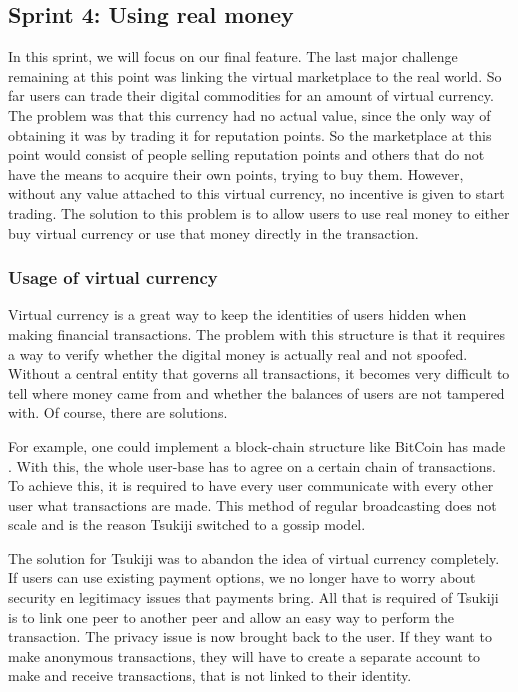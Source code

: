 \subsection{Sprint 4: Using real money}
In this sprint, we will focus on our final feature.
The last major challenge remaining at this point was linking the virtual marketplace to the real world.
So far users can trade their digital commodities for an amount of virtual currency.
The problem was that this currency had no actual value, since the only way of obtaining it was by trading it for reputation points.
So the marketplace at this point would consist of people selling reputation points and others that do not have the means to acquire their own points, trying to buy them.
However, without any value attached to this virtual currency, no incentive is given to start trading.
The solution to this problem is to allow users to use real money to either buy virtual currency or use that money directly in the transaction.

\subsubsection{Usage of virtual currency}
Virtual currency is a great way to keep the identities of users hidden when making financial transactions. 
The problem with this structure is that it requires a way to verify whether the digital money is actually real and not spoofed. 
Without a central entity that governs all transactions, it becomes very difficult to tell where money came from and whether the balances of users are not tampered with.
Of course, there are solutions.

For example, one could implement a block-chain structure like BitCoin has made \cite{bitcoin}.
With this, the whole user-base has to agree on a certain chain of transactions.
To achieve this, it is required to have every user communicate with every other user what transactions are made.
This method of regular broadcasting does not scale and is the reason Tsukiji switched to a gossip model.

The solution for Tsukiji was to abandon the idea of virtual currency completely.
If users can use existing payment options, we no longer have to worry about security en legitimacy issues that payments bring.
All that is required of Tsukiji is to link one peer to another peer and allow an easy way to perform the transaction.
The privacy issue is now brought back to the user.
If they want to make anonymous transactions, they will have to create a separate account to make and receive transactions, that is not linked to their identity.

